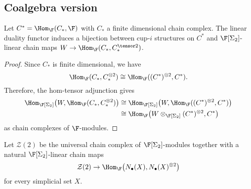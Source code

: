 %

\subsection{Coalgebra version}

\begin{lemma} \label{lemma: cup-i constructions and diagonals are the same}
	Let $C^* = \Hom_{\F}(C_*, \F)$ with $C_*$ a finite dimensional chain complex. The linear duality functor induces a bijection between cup-$i$ structures on $C^*$ and $\F[\Sigma_2]$-linear chain maps $W \to \Hom_{\F}(C_*, C_*^{\tensor 2})$.
\end{lemma}

\begin{proof}
	Since $C_\ast$ is finite dimensional, we have
	\[
	\Hom_{\F}(C_\ast, C_\ast^{\otimes 2}) \cong \Hom_{\F}((C^\ast)^{\otimes 2}, C^\ast).
	\]
	Therefore, the hom-tensor adjunction gives
	\begin{align*}
	\Hom_{\F[\Sigma_2]}\big(W, \Hom_{\F}(C_\ast, C_\ast^{\otimes 2}) \big) & \cong
	\Hom_{\F[\Sigma_2]}\big(W, \Hom_{\F}((C^\ast)^{\otimes 2}, C^\ast) \big) \\ & \cong
	\Hom_{\F} \big(W \otimes_{\F[\Sigma_2]} (C^\ast)^{\otimes 2}, C^\ast \big)
	\end{align*}
	as chain complexes of $\F$-modules.
\end{proof}

\begin{definition}
	Let $\mathcal Z(2)$ be the universal chain complex of $\F[\Sigma_2]$-modules together with a natural $\F[\Sigma_2]$-linear chain maps
	\[
	\mathcal Z(2) \to \Hom_{\F}\big( N_\bullet(X), N_\bullet(X)^{\otimes 2} \big)
	\]
	for every simplicial set $X$.
\end{definition}

